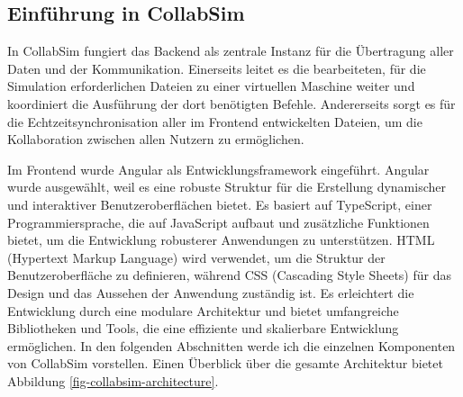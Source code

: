 \documentclass[german,version-2020-11]{uzl-thesis}
\begin{document}
  \subsection{Einführung in CollabSim}
    In CollabSim fungiert das Backend als zentrale Instanz für die Übertragung aller Daten und der Kommunikation. 
    Einerseits leitet es die bearbeiteten, für die Simulation erforderlichen Dateien zu einer virtuellen Maschine weiter und koordiniert die Ausführung der dort benötigten Befehle. 
    Andererseits sorgt es für die Echtzeitsynchronisation aller im Frontend entwickelten Dateien, um die Kollaboration zwischen allen Nutzern zu ermöglichen.

    Im Frontend wurde Angular als Entwicklungsframework eingeführt. 
    Angular wurde ausgewählt, weil es eine robuste Struktur für die Erstellung dynamischer und interaktiver Benutzeroberflächen bietet. 
    Es basiert auf TypeScript, einer Programmiersprache, die auf JavaScript aufbaut und zusätzliche Funktionen bietet, 
    um die Entwicklung robusterer Anwendungen zu unterstützen. 
    HTML (Hypertext Markup Language) wird verwendet, um die Struktur der Benutzeroberfläche zu definieren, 
    während CSS (Cascading Style Sheets) für das Design und das Aussehen der Anwendung zuständig ist. 
    Es erleichtert die Entwicklung durch eine modulare Architektur und bietet umfangreiche Bibliotheken und Tools, 
    die eine effiziente und skalierbare Entwicklung ermöglichen. 
    In den folgenden Abschnitten werde ich die einzelnen Komponenten von CollabSim vorstellen. 
    Einen Überblick über die gesamte Architektur bietet Abbildung \vref{fig-collabsim-architecture}.
\end{document}
